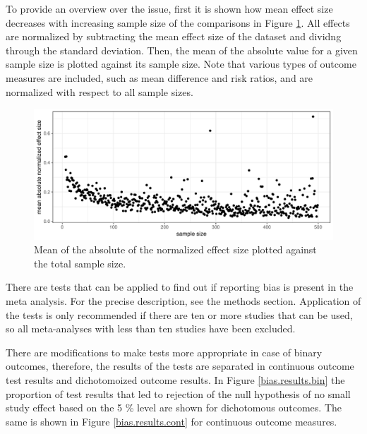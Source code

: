 \documentclass[11pt,a4paper,twoside]{book}\usepackage[]{graphicx}\usepackage[]{color}
\newenvironment{knitrout}{}{} %
\begin{document}
\vspace{0mm}
To provide an overview over the issue, first it is shown how mean effect size decreases with increasing sample size of the comparisons in Figure \ref{effect.samplesize}. All effects are normalized by subtracting the mean effect size of the dataset and dividng through the standard deviation. Then, the mean of the absolute value for a given sample size is plotted against its sample size. Note that various types of outcome measures are included, such as mean difference and risk ratios, and are normalized with respect to all sample sizes.

\begin{figure}
\begin{knitrout}
\color{fgcolor}

{\centering \includegraphics[width=\textwidth-3cm]{figure/ch02_figunnamed-chunk-17-1} 

}



\end{knitrout}
\caption{Mean of the absolute of the normalized effect size plotted against the total sample size.}
\label{effect.samplesize}
\end{figure}

\vspace{0mm}
There are tests that can be applied to find out if reporting bias is present in the meta analysis. For the precise description, see the methods section. Application of the tests is only recommended if there are ten or more studies that can be used, so all meta-analyses with less than ten studies have been excluded.

\vspace{0mm}
There are modifications to make tests more appropriate in case of binary outcomes, therefore, the results of the tests are separated in continuous outcome test results and dichotomoized outcome results. In Figure \ref{bias.results.bin} the proportion of test results that led to rejection of the null hypothesis of no small study effect based on the 5 \% level are shown for dichotomous outcomes. The same is shown in Figure \ref{bias.results.cont} for continuous outcome measures.
\end{document}
